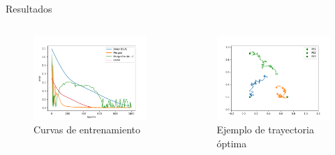 \documentclass[aspectratio=169,xcolor=dvipsnames]{beamer}
\begin{document}
\begin{frame}{Resultados}
	    \begin{columns}[c] %
		
\begin{figure}
	\centering
	\includegraphics[width=1.1\linewidth]{images/training}
	\caption{Curvas de entrenamiento}
	\label{fig:training}
\end{figure}
		\vspace*{4mm}
\begin{figure}
	\centering
	\includegraphics[width=\linewidth]{images/OptimalLQRCentrilized}
	\caption{Ejemplo de trayectoria óptima }
	\label{fig:optimallqrcentrilized}
\end{figure}
\end{columns}
\end{frame}
\end{document}

